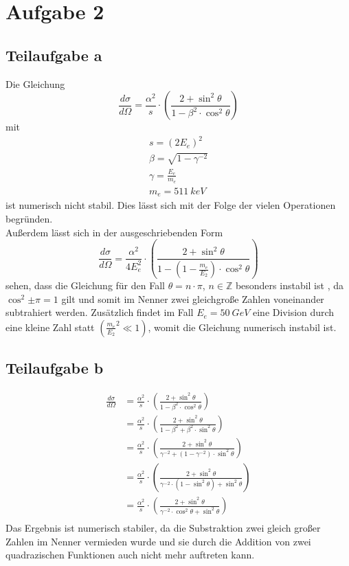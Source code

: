 \section{Aufgabe 2}
\subsection{Teilaufgabe a}
Die Gleichung
\begin{equation}
  \frac{d \sigma}{d \Omega}=\frac{\alpha ^2}{s} \cdot \left(\frac{2+\sin^2{\theta}}{1-\beta^2 \cdot \cos^2{\theta}} \right)
\end{equation}
mit
\begin{align}
  s=\left( 2E_e\right)^2 \\
  \beta=\sqrt{1-\gamma^{-2}} \\
  \gamma=\frac{E_e}{m_e} \\
  m_e= \SI{511}{keV}
\end{align}
ist numerisch nicht stabil. Dies lässt sich mit der Folge der vielen Operationen begründen. \\
Außerdem lässt sich in der ausgeschriebenden Form
\begin{equation}
  \frac{d \sigma}{d \Omega}=\frac{\alpha ^2}{4E^2_{e}} \cdot \left(\frac{2+\sin^2{\theta}}{1-\left(1-\frac{m_{e}}{E_{2}} \right) \cdot \cos^2{\theta}} \right)
\end{equation}
sehen, dass die Gleichung für den Fall $\theta = n \cdot \pi$, $n \in \mathbb{Z}$ besonders instabil ist , da
$\cos^2{\pm \pi}=1$ gilt und somit im Nenner  zwei gleichgroße Zahlen voneinander subtrahiert werden.
Zusätzlich findet im Fall $E_e=\SI{50}{GeV}$ eine Division durch eine kleine Zahl statt $\left( {\frac{m_{e}}{E_{2}}}^2 \ll 1 \right)$, womit die Gleichung numerisch instabil ist.


\subsection{Teilaufgabe b} \label{sec:2b}

\begin{align}
  \frac{d \sigma}{d \Omega} &= \frac{\alpha ^2}{s} \cdot \left(\frac{2+\sin^2{\theta}}{1-\beta^2 \cdot \cos^2{\theta}} \right) \\
  &=\frac{\alpha ^2}{s} \cdot \left(\frac{2+\sin^2{\theta}}{1-\beta^2 + \beta^2 \cdot \sin^2{\theta}} \right) \\
  &=\frac{\alpha ^2}{s} \cdot \left(\frac{2+\sin^2{\theta}}{\gamma^{-2} + \left(1-\gamma^{-2} \right) \cdot \sin^2{\theta}} \right) \\
  &=\frac{\alpha ^2}{s} \cdot \left(\frac{2+\sin^2{\theta}}{\gamma^{-2} \cdot \left(1-\sin^{2}{\theta} \right) + \sin^2{\theta}} \right) \\
  &=\frac{\alpha ^2}{s} \cdot \left(\frac{2+\sin^2{\theta}}{\gamma^{-2} \cdot \cos^2{\theta} + \sin^2{\theta}} \right)  \label{eqn:dwqsb}\\
\end{align}
Das Ergebnis ist numerisch stabiler, da die Substraktion zwei gleich großer Zahlen im Nenner vermieden wurde und sie durch die Addition von zwei quadrazischen Funktionen auch nicht mehr auftreten kann.


